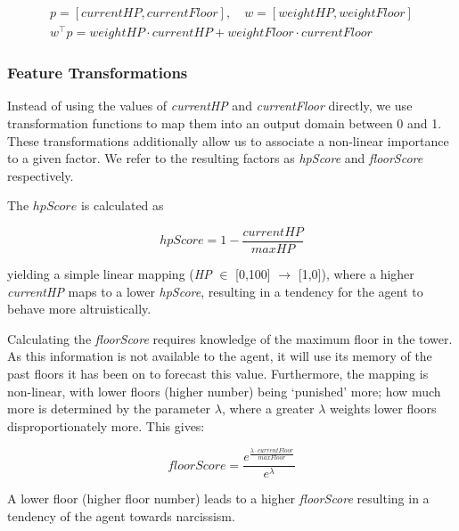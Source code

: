 \begin{equation}
    \begin{gathered}
    p = [\mathit{currentHP, currentFloor}],\quad w=[\mathit{weightHP, weightFloor}] \\ 
    w^\top{}p = \mathit{weightHP \cdot currentHP + weightFloor \cdot currentFloor}
    \end{gathered}
\end{equation}



\subsubsection{Feature Transformations} \label{sec:featTran}

Instead of using the values of \textit{currentHP} and \textit{currentFloor} directly, we use transformation functions to map them into an output domain between 0 and 1. These transformations additionally allow us to associate a non-linear importance to a given factor. We refer to the resulting factors as \textit{hpScore} and \textit{floorScore} respectively.

The $hpScore$ is calculated as

\begin{equation}
    \mathit{hpScore} = 1 - \frac{\mathit{currentHP}}{\mathit{maxHP}}
\end{equation}

yielding a simple linear mapping (\textit{HP} $\in$ [0,100] $\rightarrow$ [1,0]), where a higher \textit{currentHP} maps to a lower \textit{hpScore}, resulting in a tendency for the agent to behave more altruistically.

Calculating the \textit{floorScore} requires knowledge of the maximum floor in the tower. As this information is not available to the agent, it will use its memory of the past floors it has been on to forecast this value. Furthermore, the mapping is non-linear, with lower floors (higher number) being `punished' more; how much more is determined by the parameter $\lambda$, where a greater $\lambda$ weights lower floors disproportionately more. This gives:

\begin{equation}
    \mathit{floorScore} = \frac{e^{\frac{\lambda\cdot \mathit{currentFloor}}{\mathit{maxFloor}}}}{e^{\lambda}}
\end{equation}

A lower floor (higher floor number) leads to a higher \textit{floorScore} resulting in a tendency of the agent towards narcissism.

